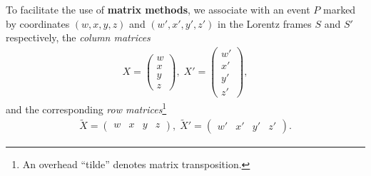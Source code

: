 To facilitate the use of \textbf{matrix methods}, we 
associate with an event $P$ marked by coordinates 
$(w,x,y,z)$ and $(w',x',y',z')$ in the Lorentz frames $S$ 
and $S'$ respectively,  the \textsl{column matrices}
\begin{align*}
X=\begin{pmatrix} w\\x\\y\\z\end{pmatrix} ,\;
X'=\begin{pmatrix} w'\\x'\\y'\\z'\end{pmatrix} ,
\end{align*}
and the corresponding \textsl{row matrices}\footnote{An 
overhead ``tilde'' denotes matrix transposition.}
\begin{align*}
\tilde{X}=\begin{pmatrix}
 w& x& y& z 
\end{pmatrix} ,\;
\tilde{X}'=\begin{pmatrix}
w'&x'&y'&z' 
\end{pmatrix}.
\end{align*}
